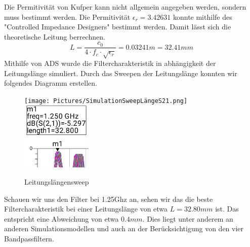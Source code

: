     Die Permitivität von Kufper kann nicht allgemein angegeben werden, sondern muss bestimmt werden. 
    Die Permitivität $\epsilon_r = 3.42631$ konnte mithilfe des "Controlled Impedance Designers" bestimmt werden. Damit lässt sich die theoretische Leitung berrechnen.
    \begin{equation}
        L= \frac{c_0}{4 \cdot f_c \cdot \sqrt{\epsilon_r}} = 0.03241m = 32.41mm
        \label{eq:laenge}
    \end{equation}
    \clearpage
    Mithilfe von ADS wurde die Filtercharakteristik in abhängigkeit der Leitungslänge simuliert. Durch das Sweepen der 
    Leitungslänge konnten wir folgendes Diagramm erstellen.
    \begin{figure}[H]
        \texttt{[image: Pictures/SimulationSweepLängeS21.png]}
        \includegraphics[width=0.3\textwidth]{Pictures/gezoomt.png}
        \centering
        \caption{Leitungslängensweep}
    \end{figure}
    Schauen wir uns den Filter bei 1.25Ghz an, sehen wir das die beste Filtercharakteristik bei einer
    Leitungslänge von etwa $L=32.80mm$ ist.
    Das entspricht eine Abweichung von etwa $0.4mm$. Dies liegt unter anderem an anderen 
    Simulationsmodellen und auch an der Berücksichtigung von den vier Bandpassfiltern.

    \clearpage
